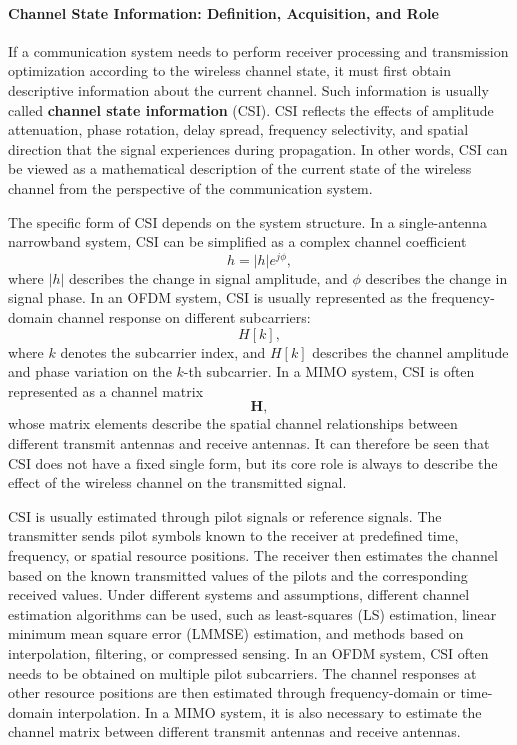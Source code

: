 \paragraph{Channel State Information: Definition, Acquisition, and Role}

If a communication system needs to perform receiver processing and transmission optimization
according to the wireless channel state,
it must first obtain descriptive information about the current channel.
Such information is usually called \textbf{channel state information} (CSI).
CSI reflects the effects of amplitude attenuation,
phase rotation,
delay spread,
frequency selectivity,
and spatial direction that the signal experiences during propagation.
In other words,
CSI can be viewed as a mathematical description of the current state of the wireless channel
from the perspective of the communication system.

The specific form of CSI depends on the system structure.
In a single-antenna narrowband system,
CSI can be simplified as a complex channel coefficient
\begin{equation}
    h
    =
    |h|e^{j\phi},
    \label{eq:csi-siso-coefficient}
\end{equation}
where
\(|h|\) describes the change in signal amplitude,
and \(\phi\) describes the change in signal phase.
In an OFDM system,
CSI is usually represented as the frequency-domain channel response on different subcarriers:
\begin{equation}
    H[k],
    \label{eq:csi-ofdm-subcarrier}
\end{equation}
where
\(k\) denotes the subcarrier index,
and \(H[k]\) describes the channel amplitude and phase variation on the \(k\)-th subcarrier.
In a MIMO system,
CSI is often represented as a channel matrix
\begin{equation}
    \mathbf{H},
    \label{eq:csi-mimo-matrix}
\end{equation}
whose matrix elements describe the spatial channel relationships
between different transmit antennas and receive antennas.
It can therefore be seen that CSI does not have a fixed single form,
but its core role is always to describe the effect of the wireless channel on the transmitted signal.

CSI is usually estimated through pilot signals or reference signals.
The transmitter sends pilot symbols known to the receiver at predefined time,
frequency,
or spatial resource positions.
The receiver then estimates the channel based on the known transmitted values of the pilots
and the corresponding received values.
Under different systems and assumptions,
different channel estimation algorithms can be used,
such as least-squares (LS) estimation,
linear minimum mean square error (LMMSE) estimation,
and methods based on interpolation,
filtering,
or compressed sensing.
In an OFDM system,
CSI often needs to be obtained on multiple pilot subcarriers.
The channel responses at other resource positions are then estimated through frequency-domain or time-domain interpolation.
In a MIMO system,
it is also necessary to estimate the channel matrix between different transmit antennas and receive antennas.

